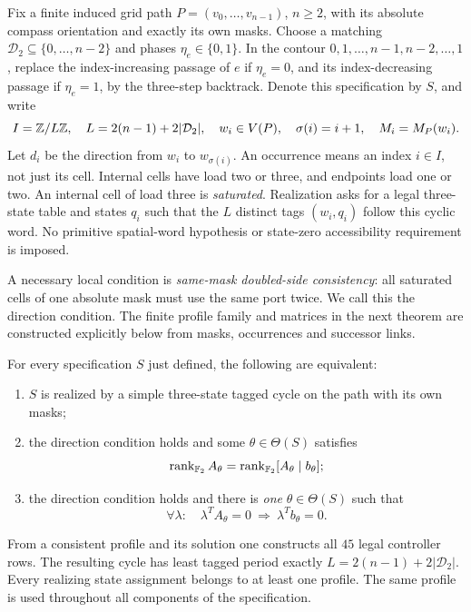Fix a finite induced grid path $P=(v_0,\ldots,v_{n-1})$, $n\ge2$, with its absolute
compass orientation and exactly its own masks. Choose a matching
$\mathcal D_2\subseteq\{0,\ldots,n-2\}$ and phases $\eta_e\in\{0,1\}$.
In the contour $0,1,\ldots,n-1,n-2,\ldots,1$, replace the index-increasing passage
of $e$ if $\eta_e=0$, and its index-decreasing passage if $\eta_e=1$, by the
three-step backtrack. Denote this specification by $S$, and write
\[
 I=\mathbb Z/L\mathbb Z,\quad L=2(n-1)+2|\mathcal D_2|,\quad
 w_i\in V(P),\quad \sigma(i)=i+1,\quad M_i=M_P(w_i).
\]
Let $d_i$ be the direction from $w_i$ to $w_{\sigma(i)}$.
An occurrence means an index $i\in I$, not just its cell. Internal cells have load
two or three, and endpoints load one or two. An internal cell of load three is
\emph{saturated}. Realization asks for a legal three-state table and states $q_i$
such that the $L$ distinct tags $(w_i,q_i)$ follow this cyclic word. No primitive
spatial-word hypothesis or state-zero accessibility requirement is imposed.

A necessary local condition is \emph{same-mask doubled-side consistency}: all
saturated cells of one absolute mask must use the same port twice. We call this the
direction condition. The finite profile family and matrices in the next theorem are
constructed explicitly below from masks, occurrences and successor links.

\begin{theorem}\label{thm:three-state-realization}
For every specification $S$ just defined, the following are equivalent:
\begin{enumerate}[label=(\roman*),leftmargin=2em]
\item $S$ is realized by a simple three-state tagged cycle on the path with its own masks;
\item the direction condition holds and some $\theta\in\Theta(S)$ satisfies
\[
 \operatorname{rank}_{\mathbb F_2}A_\theta=\operatorname{rank}_{\mathbb F_2}[A_\theta\mid b_\theta];
\]
\item the direction condition holds and there is \emph{one} $\theta\in\Theta(S)$ such that
\[
 \forall\lambda:\quad\lambda^TA_\theta=0\ \Longrightarrow\ \lambda^Tb_\theta=0.
\]
\end{enumerate}
From a consistent profile and its solution one constructs all $45$ legal controller
rows. The resulting cycle has least tagged period exactly
$L=2(n-1)+2|\mathcal D_2|$. Every realizing state assignment belongs to at least one
profile. The same profile is used throughout all components of the specification.
\end{theorem}

